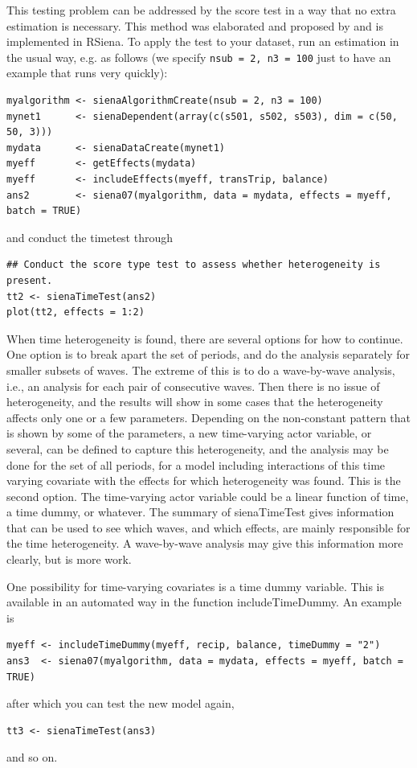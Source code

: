 \documentclass[a4paper,fleqn,11pt]{article}
\newcommand{\+}{\, + \,}
\newcommand{\sfn}[1]{\textsf{#1}}
\begin{document}
This testing problem can be addressed by the score test in a way that
no extra estimation is necessary. This method was elaborated and proposed by
\citet{Lospinoso2011} and is implemented in RSiena.  To apply the
test to your dataset, run an estimation in the usual way, e.g. as follows
(we specify \texttt{nsub = 2, n3 = 100} just to have an example that runs
very quickly):
\begin{verbatim}
myalgorithm <- sienaAlgorithmCreate(nsub = 2, n3 = 100)
mynet1      <- sienaDependent(array(c(s501, s502, s503), dim = c(50, 50, 3)))
mydata      <- sienaDataCreate(mynet1)
myeff       <- getEffects(mydata)
myeff       <- includeEffects(myeff, transTrip, balance)
ans2        <- siena07(myalgorithm, data = mydata, effects = myeff, batch = TRUE)
\end{verbatim}
and conduct the timetest through
\begin{verbatim}
## Conduct the score type test to assess whether heterogeneity is present.
tt2 <- sienaTimeTest(ans2)
plot(tt2, effects = 1:2)
\end{verbatim}

When time heterogeneity is found, there are several options for how to continue.
One option is to break apart the set of periods, and do the analysis separately
for smaller subsets of waves. The extreme of this is to do a wave-by-wave analysis,
i.e., an analysis for each pair of consecutive waves.
Then there is no issue of heterogeneity, and the results
will show in some cases that the heterogeneity affects only one or a few parameters.
Depending on the non-constant pattern that is shown by some of the parameters,
a new time-varying actor variable, or several, can be defined to
capture this heterogeneity,
and the analysis may be done for the set of all periods, for a model including
interactions of this time varying covariate with the effects for
which heterogeneity was found. This is the second option.
The time-varying actor variable could be a linear function of time, a time dummy,
or whatever.
The summary of \sfn{sienaTimeTest} gives information that can
be used to see which waves, and which effects, are mainly responsible for
the time heterogeneity. A wave-by-wave analysis may give this information
more clearly, but is more work.

One possibility for time-varying covariates is a time dummy variable.
This is available in an automated way in the
function \sfn{includeTimeDummy}. An example is
\begin{verbatim}
myeff <- includeTimeDummy(myeff, recip, balance, timeDummy = "2")
ans3  <- siena07(myalgorithm, data = mydata, effects = myeff, batch = TRUE)
\end{verbatim}
after which you can test the new model again,
\begin{verbatim}
tt3 <- sienaTimeTest(ans3)
\end{verbatim}
and so on.
\end{document}
